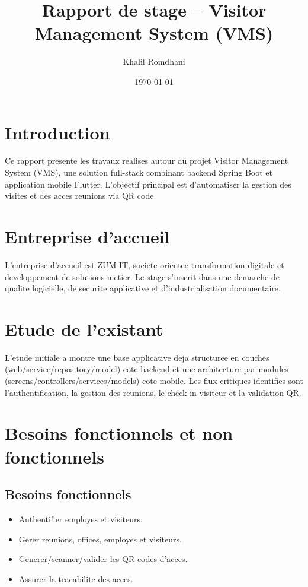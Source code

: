 \documentclass[12pt,a4paper]{article}
\title{Rapport de stage -- Visitor Management System (VMS)}
\author{Khalil Romdhani}
\date{\today}
\begin{document}
\maketitle
\tableofcontents
\newpage

\section{Introduction}
Ce rapport presente les travaux realises autour du projet Visitor Management System (VMS), une solution full-stack combinant backend Spring Boot et application mobile Flutter. L'objectif principal est d'automatiser la gestion des visites et des acces reunions via QR code.

\section{Entreprise d'accueil}
L'entreprise d'accueil est ZUM-IT, societe orientee transformation digitale et developpement de solutions metier. Le stage s'inscrit dans une demarche de qualite logicielle, de securite applicative et d'industrialisation documentaire.

\section{Etude de l'existant}
L'etude initiale a montre une base applicative deja structuree en couches (web/service/repository/model) cote backend et une architecture par modules (screens/controllers/services/models) cote mobile. Les flux critiques identifies sont l'authentification, la gestion des reunions, le check-in visiteur et la validation QR.

\section{Besoins fonctionnels et non fonctionnels}
\subsection{Besoins fonctionnels}
\begin{itemize}
  \item Authentifier employes et visiteurs.
  \item Gerer reunions, offices, employes et visiteurs.
  \item Generer/scanner/valider les QR codes d'acces.
  \item Assurer la tracabilite des acces.
\end{itemize}
\end{document}
